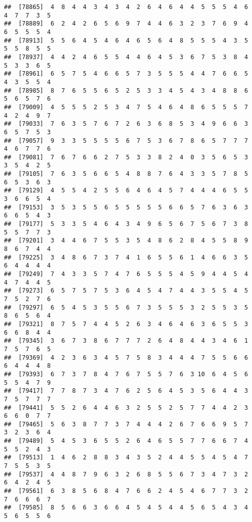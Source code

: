 \documentclass[
]{book}
\begin{document}
\begin{verbatim}
##  [78865]  4  8  4  4  3  4  3  4  2  6  4  6  4  4  5  5  5  4  6  4  7  7  3  5
##  [78889]  6  2  4  2  6  5  6  9  7  4  4  6  3  2  3  7  6  9  4  6  5  5  5  4
##  [78913]  5  5  6  4  5  4  6  4  6  5  6  4  8  5  5  5  4  3  5  5  5  8  5  5
##  [78937]  4  4  2  4  6  5  5  4  4  6  4  5  3  6  7  5  3  8  4  5  3  3  6  5
##  [78961]  6  5  7  5  4  6  6  5  7  3  5  5  5  4  4  7  6  6  5  4  3  5  5  4
##  [78985]  8  7  6  5  5  6  5  2  5  3  3  4  5  4  3  4  8  8  6  5  6  5  7  6
##  [79009]  4  5  5  5  2  5  3  4  7  5  4  6  4  8  6  5  5  5  7  4  2  4  9  7
##  [79033]  7  6  3  5  7  6  7  2  6  3  6  8  5  3  4  9  6  6  3  6  5  7  5  3
##  [79057]  9  3  3  5  5  5  5  6  7  5  3  6  7  8  6  5  7  7  7  4  6  7  7  6
##  [79081]  7  6  7  6  6  2  7  5  3  3  8  2  4  0  3  5  6  5  3  3  5  4  2  5
##  [79105]  7  6  3  5  6  6  5  4  8  8  7  6  4  3  3  5  7  8  5  6  5  3  6  3
##  [79129]  4  5  5  4  2  5  5  6  4  6  4  5  7  4  4  4  6  5  5  3  6  6  5  4
##  [79153]  3  5  3  5  5  6  5  5  5  5  5  6  6  5  7  6  3  6  3  6  6  5  4  3
##  [79177]  5  3  3  5  4  6  4  3  4  9  6  5  6  7  5  6  7  3  8  5  5  7  7  3
##  [79201]  3  4  4  6  7  5  5  3  5  4  8  6  2  8  4  5  5  8  9  8  6  7  4  4
##  [79225]  3  4  8  6  7  3  7  4  1  6  5  5  6  1  4  6  6  3  5  6  4  4  4  4
##  [79249]  7  4  3  3  5  7  4  7  6  5  5  5  4  5  9  4  4  5  4  4  7  4  4  5
##  [79273]  6  5  7  5  7  5  3  6  4  5  4  7  4  4  3  5  5  4  5  7  5  2  7  6
##  [79297]  6  5  4  5  3  5  5  6  7  3  5  5  5  3  2  5  5  3  5  8  6  5  6  4
##  [79321]  8  7  5  7  4  4  5  2  6  3  4  6  4  6  3  6  5  5  3  6  6  8  4  4
##  [79345]  3  6  7  3  8  6  7  7  7  2  6  4  8  4  4  3  4  6  1  7  5  7  6  5
##  [79369]  4  2  3  6  3  4  5  7  5  8  3  4  4  4  7  5  5  6  6  6  4  4  4  8
##  [79393]  6  7  3  7  8  4  7  6  7  5  5  7  6  3 10  6  4  5  6  5  5  4  7  9
##  [79417]  7  7  8  7  3  4  7  6  2  5  6  4  5  3  5  6  4  4  3  7  5  7  7  7
##  [79441]  5  5  2  6  4  4  6  3  2  5  5  2  5  7  7  4  4  2  3  6  6  0  7  7
##  [79465]  5  6  3  8  7  7  3  7  4  4  4  2  6  7  6  6  9  5  7  3  2  3  6  4
##  [79489]  5  4  5  3  6  5  5  2  6  4  6  5  5  7  7  6  6  7  4  5  5  2  4  3
##  [79513]  1  4  6  2  8  8  3  4  3  5  2  4  4  5  5  4  5  4  7  7  5  5  3  5
##  [79537]  4  4  8  7  9  6  3  2  6  8  5  5  6  7  3  4  7  3  2  6  4  2  4  5
##  [79561]  6  3  8  5  6  8  4  7  6  6  2  4  5  4  6  7  7  3  2  7  6  6  6  7
##  [79585]  8  5  6  6  3  6  6  4  5  4  5  4  4  5  6  5  4  3  4  5  6  5  5  6

\end{verbatim}
\end{document}
